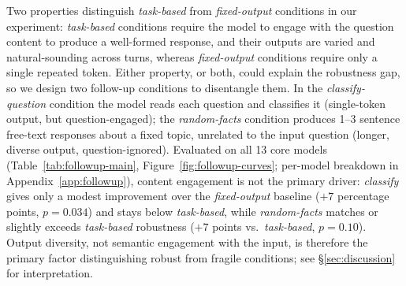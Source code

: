 Two properties distinguish \emph{task-based} from \emph{fixed-output} conditions in our experiment: \emph{task-based} conditions require the model to engage with the question content to produce a well-formed response, and their outputs are varied and natural-sounding across turns, whereas \emph{fixed-output} conditions require only a single repeated token. Either property, or both, could explain the robustness gap, so we design two follow-up conditions to disentangle them. In the \emph{classify-question} condition the model reads each question and classifies it (single-token output, but question-engaged); the \emph{random-facts} condition produces 1--3 sentence free-text responses about a fixed topic, unrelated to the input question (longer, diverse output, question-ignored). Evaluated on all 13 core models (Table~\ref{tab:followup-main}, Figure~\ref{fig:followup-curves}; per-model breakdown in Appendix~\ref{app:followup}), content engagement is not the primary driver: \emph{classify} gives only a modest improvement over the \emph{fixed-output} baseline ($+7$ percentage points, $p{=}0.034$) and stays below \emph{task-based}, while \emph{random-facts} matches or slightly exceeds \emph{task-based} robustness ($+7$ points vs.\ \emph{task-based}, $p{=}0.10$). Output diversity, not semantic engagement with the input, is therefore the primary factor distinguishing robust from fragile conditions; see \S\ref{sec:discussion} for interpretation.









